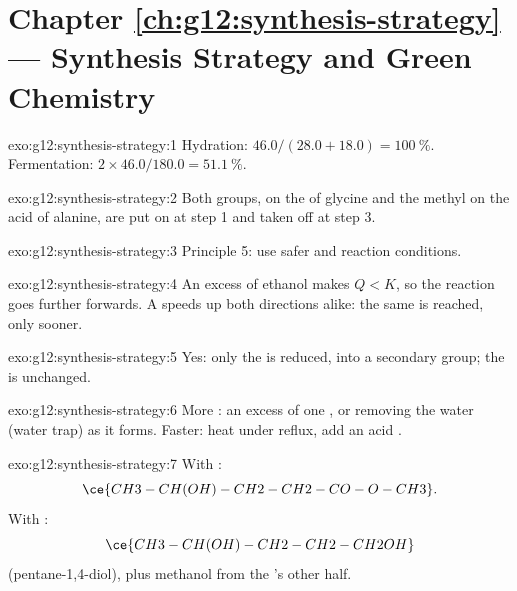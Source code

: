 \section*{Chapter \ref{ch:g12:synthesis-strategy} --- Synthesis Strategy and Green Chemistry}

\begin{solution}{exo:g12:synthesis-strategy:1}
Hydration: $46.0/(28.0 + 18.0) = \qty{100}{\percent}$. Fermentation:
$2 \times 46.0/180.0 = \qty{51.1}{\percent}$.
\end{solution}

\begin{solution}{exo:g12:synthesis-strategy:2}
Both groups,  on the  of glycine and the methyl  on the acid
of alanine, are put on at step 1 and taken off at step 3.
\end{solution}

\begin{solution}{exo:g12:synthesis-strategy:3}
Principle 5: use safer  and reaction conditions.
\end{solution}

\begin{solution}{exo:g12:synthesis-strategy:4}
An excess of ethanol makes $Q < K$, so the reaction goes further
forwards. A  speeds up both directions alike: the same  is reached, only sooner.
\end{solution}

\begin{solution}{exo:g12:synthesis-strategy:5}
Yes: only the  is reduced, into a secondary  group; the
 is unchanged.
\end{solution}

\begin{solution}{exo:g12:synthesis-strategy:6}
More : an excess of one , or removing the water (water trap)
as it forms. Faster: heat under reflux, add an acid .
\end{solution}

\begin{solution}{exo:g12:synthesis-strategy:7}
With :
\[ \ce{CH3-CH(OH)-CH2-CH2-CO-O-CH3} . \]
With :
\[ \ce{CH3-CH(OH)-CH2-CH2-CH2OH} \]
(pentane-1,4-diol), plus methanol from the 's other half.
\end{solution}

